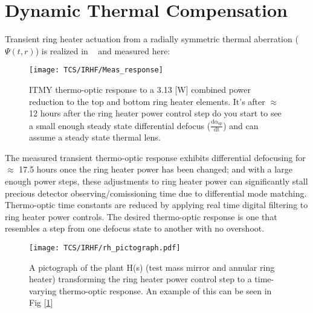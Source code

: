\section{Dynamic Thermal Compensation}\label{sec:dtc}
Transient ring heater actuation from a radially symmetric thermal aberration ($\Psi(t,r)$) is realized in ~\cite{ramette:2016} and measured here:

\begin{figure}[H]
    \centering
     \texttt{[image: TCS/IRHF/Meas\_response]}
     \caption{ITMY thermo-optic response to a 3.13 [W] combined power reduction to the top and bottom ring heater elements. It's after $\approx$ 12 hours after the ring heater power control step do you start to see a small enough steady state differential defocus ($\frac{\mathrm{d} \alpha_\mathrm{sp}}{\mathrm{dt}}$) and can assume a steady state thermal lens. }
     \label{fig:RHresp}
\end{figure}

The measured transient thermo-optic response exhibits differential defocusing for $\approx$ 17.5 hours once the ring heater power has been changed; and with a large enough power steps, these adjustments to ring heater power can significantly stall precious detector observing/comissioning time due to differential mode matching. Thermo-optic time constants are reduced by applying real time digital filtering to ring heater power controls. The desired thermo-optic response is one that resembles a step from one defocus state to another with no overshoot. 

\iffalse
\begin{figure}[H]
	\centering
	\texttt{[image: TCS/IRHF/RH\_control\_diagram.pdf]}
	\caption{A simple controls diagram depicting the concept of a RH control pre-filter (\textbf{G(s)}) taking a step input (\textbf{u(t)}) and transforming it before reaching the thermo-optic plant (\textbf{H(s)}) with output can also be generalized to an adaptive optics control loop.}
	\label{fig:RH_control}
\end{figure}
\fi 

\begin{figure}[H]
    \centering
    \texttt{[image: TCS/IRHF/rh\_pictograph.pdf]}
    \caption{A pictograph of the plant H(s) (test mass mirror and annular ring heater) transforming the ring heater power control step to a time-varying thermo-optic response. An example of this can be seen in Fig [\ref{fig:RHresp}]}
    \label{fig:justplant}
\end{figure}

